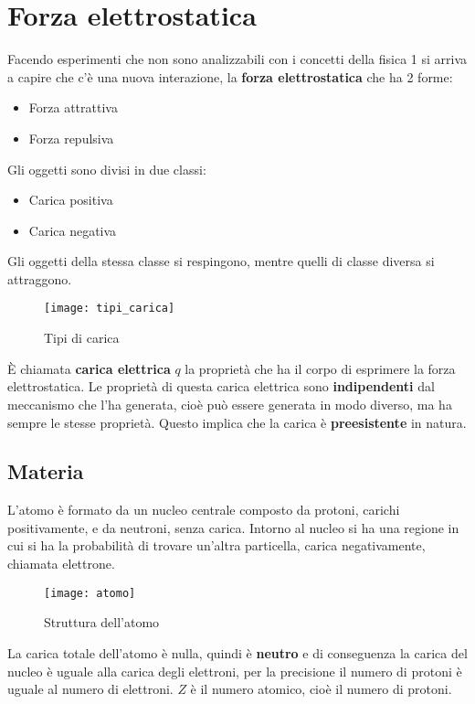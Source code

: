 \documentclass[a4paper]{article}
\begin{document}
\section{Forza elettrostatica}
Facendo esperimenti che non sono analizzabili con i concetti della fisica 1 si arriva
a capire che c'è una nuova interazione, la \textbf{forza elettrostatica} che ha 2 forme:
\begin{itemize}
  \item Forza attrattiva
  \item Forza repulsiva
\end{itemize}
Gli oggetti sono divisi in due classi:
\begin{itemize}
  \item Carica positiva
  \item Carica negativa
\end{itemize}
Gli oggetti della stessa classe si respingono, mentre quelli di classe diversa si attraggono.
\begin{figure}[H]
  \centering
  \texttt{[image: tipi\_carica]}
  \caption{Tipi di carica}
\end{figure}
\begin{definition}
  È chiamata \textbf{carica elettrica} \( q \) la proprietà che ha il corpo di esprimere
  la forza elettrostatica. Le proprietà di questa carica elettrica sono \textbf{indipendenti} dal
  meccanismo che l'ha generata, cioè può essere generata in modo diverso, ma ha sempre le
  stesse proprietà. Questo implica che la carica è \textbf{preesistente} in natura.
\end{definition}

\subsection{Materia}
L'atomo è formato da un nucleo centrale composto da protoni, carichi positivamente, e da
neutroni, senza carica. Intorno al nucleo si ha una regione in cui si ha la probabilità
di trovare un'altra particella, carica negativamente, chiamata elettrone.
\begin{figure}[H]
  \centering
  \texttt{[image: atomo]}
  \caption{Struttura dell'atomo}
\end{figure}
\noindent
La carica totale dell'atomo è nulla, quindi è \textbf{neutro} e
di conseguenza la carica del nucleo è uguale alla carica degli elettroni, per la precisione
il numero di protoni è uguale al numero di elettroni. \( Z \) è il numero atomico, cioè
il numero di protoni.
\end{document}
